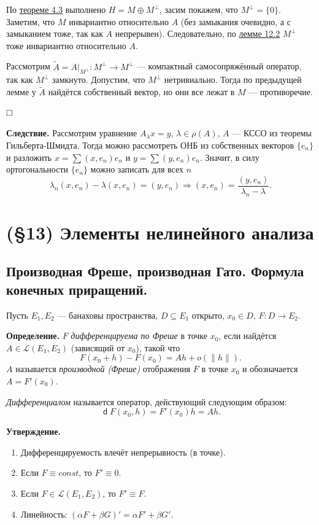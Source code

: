 \documentclass[12pt, a4paper]{article}
\DeclareMathOperator{\dif}{\mathsf{d}}
\newcommand{\QED}{$\hfill\square$}
\renewcommand{\subset}{\subseteq}   %
\begin{document}
По \hyperref[th:4-3]{теореме 4.3} выполнено $H = M \oplus M^\bot$, засим покажем, что $M^\bot = \{0\}$.
Заметим, что $M$ инвариантно относительно $A$ (без замыкания очевидно, а с замыканием тоже, так как $A$ непрерывен).
Следовательно, по \hyperref[l:12.2]{лемме 12.2} $M^\bot$ тоже инвариантно относительно $A$.

Рассмотрим $\tilde A = A|_{M^\bot}\colon M^\bot \to M^\bot$ --- компактный самосопряжённый оператор, так как $M^\bot$ замкнуто.
Допустим, что $M^\bot$ нетривиально. Тогда по предыдущей лемме у $\tilde A$ найдётся собственный вектор, но они все лежат в $M$ --- противоречие.

\QED

\textbf{Следствие.}
Рассмотрим уравнение $A_\lambda x = y$, $\lambda \in \rho(A)$, $A$ --- КССО из теоремы Гильберта-Шмидта.
Тогда можно рассмотреть ОНБ из собственных векторов $\{e_n\}$ и разложить $x = \sum (x, e_n) e_n$ и $y = \sum (y, e_n) e_n$.
Значит, в силу ортогональности $\{e_n\}$ можно записать для всех $n$
\[
    \lambda_n (x, e_n) - \lambda (x, e_n) = (y, e_n) \Rightarrow (x, e_n) = \frac{(y, e_n)}{\lambda_n - \lambda}.
\]



\section{(§13) Элементы нелинейного анализа}

\subsection{Производная Фреше, производная Гато. Формула конечных приращений.}

Пусть $E_1, E_2$ --- банаховы пространства, $D \subset E_1$ открыто, $x_0 \in D$, $F: D \to E_2$.

\textbf{Определение.} $F$ \textit{дифференцируема по Фреше} в точке $x_0$, если найдётся $A \in \mathcal L(E_1, E_2)$ (зависящий от $x_0$), такой что
\[
    F(x_0 + h) - F(x_0) = Ah + o(\|h\|).
\]
$A$ называется \textit{производной (Фреше)} отображения $F$ в точке $x_0$ и обозначается $A = F'(x_0)$.

\textit{Дифференциалом} называется оператор, действующий следующим образом:
\[
    \dif F(x_0, h) = F'(x_0) h = Ah.
\]

\textbf{Утверждение.} 
\begin{enumerate}
    \item Дифференцируемость влечёт непрерывность (в точке).
    \item Если $F \equiv const$, то $F' \equiv 0$.
    \item Если $F \in \mathcal L(E_1, E_2)$, то $F' \equiv F$.
    \item Линейность: $(\alpha F + \beta G)' = \alpha F' + \beta G'$.
\end{enumerate}
\end{document}
